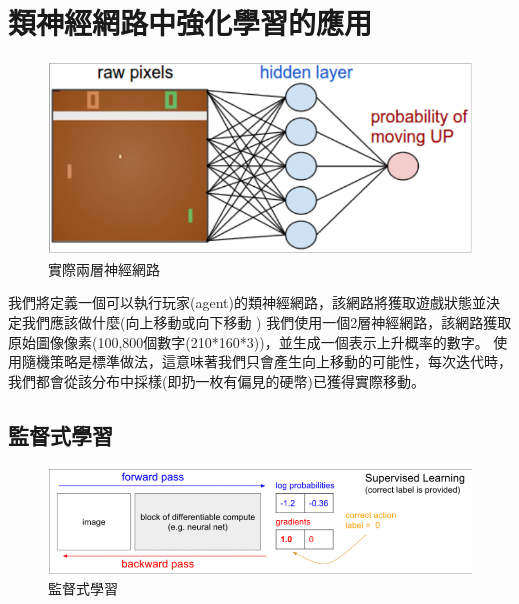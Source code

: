 \documentclass[14pt,a4paper]{report}  %
\begin{document}
\section{類神經網路中強化學習的應用}
\begin{figure}[hbt!]
\begin{center}
\includegraphics[scale=0.74]{ network}
\caption{\Large 實際兩層神經網路}
\label{實際兩層神經網路}
\end{center}

\end{figure}

 我們將定義一個可以執行玩家(agent)的類神經網路，該網路將獲取遊戲狀態並決定我們應該做什麼(向上移動或向下移動
) 我們使用一個2層神經網路，該網路獲取原始圖像像素(100,800個數字(210*160*3))，並生成一個表示上升概率的數字。 使用隨機策略是標準做法，這意味著我們只會產生向上移動的可能性，每次迭代時，我們都會從該分布中採樣(即扔一枚有偏見的硬幣)已獲得實際移動。\\


\subsection{監督式學習}
\begin{figure}[hbt!]
\begin{center}
\includegraphics[scale=0.74]{supervising_learning}
\caption{\Large 監督式學習}
\label{監督式學習}
\end{center}
\end{figure}
\end{document}
